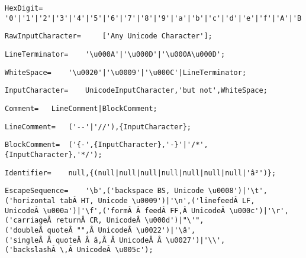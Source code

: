 \documentclass{article}
\begin{document}
    \begin{lstlisting}[mathescape=true]
     HexDigit= 	'0'|'1'|'2'|'3'|'4'|'5'|'6'|'7'|'8'|'9'|'a'|'b'|'c'|'d'|'e'|'f'|'A'|'B'|'C'|'D'|'E'|'F';
    \end{lstlisting}
    
    \begin{lstlisting}[mathescape=true]
     RawInputCharacter= 	['Any Unicode Character'];
    \end{lstlisting}
    
    \begin{lstlisting}[mathescape=true]
     LineTerminator= 	'\u000A'|'\u000D'|'\u000A\u000D';
    \end{lstlisting}
    
    \begin{lstlisting}[mathescape=true]
     WhiteSpace= 	'\u0020'|'\u0009'|'\u000C'|LineTerminator;
    \end{lstlisting}
    
    \begin{lstlisting}[mathescape=true]
     InputCharacter= 	UnicodeInputCharacter,'but not',WhiteSpace;
    \end{lstlisting}
    
    \begin{lstlisting}[mathescape=true]
     Comment= 	LineComment|BlockComment;
    \end{lstlisting}
    
    \begin{lstlisting}[mathescape=true]
     LineComment= 	('--'|'//'),{InputCharacter};
    \end{lstlisting}
    
    \begin{lstlisting}[mathescape=true]
     BlockComment= 	('{-',{InputCharacter},'-}'|'/*',{InputCharacter},'*/');
    \end{lstlisting}
    
    \begin{lstlisting}[mathescape=true]
     Identifier= 	null,{(null|null|null|null|null|null|null|'â²')};
    \end{lstlisting}
    
    \begin{lstlisting}[mathescape=true]
     EscapeSequence= 	'\b',('backspace BS, Unicode \u0008')|'\t',('horizontal tabÂ HT, Unicode \u0009')|'\n',('linefeedÂ LF, UnicodeÂ \u000a')|'\f',('formÂ Â feedÂ FF,Â UnicodeÂ \u000c')|'\r',('carriageÂ returnÂ CR, UnicodeÂ \u000d')|"\'",('doubleÂ quoteÂ "",Â UnicodeÂ \u0022')|'\â',('singleÂ Â quoteÂ Â â,Â Â UnicodeÂ Â \u0027')|'\\',('backslashÂ \,Â UnicodeÂ \u005c');
    \end{lstlisting}
    
\end{document}
